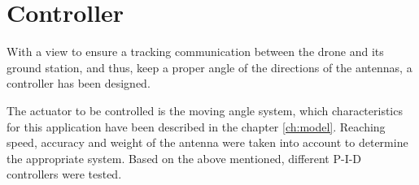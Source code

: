 \chapter{Controller}\label{sec:controller}
With a view to ensure a tracking communication between the drone and its ground station, and thus, keep a proper angle of the directions of the antennas, a controller has been designed.\par

The actuator to be controlled is the moving angle system, which characteristics for this application have been described in the chapter \ref{ch:model}.  Reaching speed, accuracy and weight of the antenna were taken into account to determine the appropriate system. Based on the above mentioned, different P-I-D controllers were tested.\par 	









